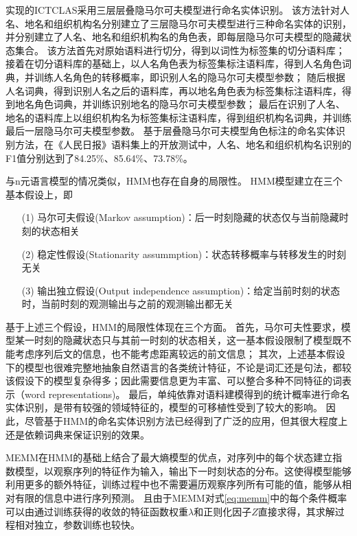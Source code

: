 \citet{张华平2004基于角色标注的中国人名自动识别研究}实现的ICTCLAS采用三层层叠隐马尔可夫模型进行命名实体识别。
该方法针对人名、地名和组织机构名分别建立了三层隐马尔可夫模型进行三种命名实体的识别，并分别建立了人名、地名和组织机构名的角色表，即每层隐马尔可夫模型的隐藏状态集合。
该方法首先对原始语料进行切分，得到以词性为标签集的切分语料库；
接着在切分语料库的基础上，以人名角色表为标签集标注语料库，得到人名角色词典，并训练人名角色的转移概率，即识别人名的隐马尔可夫模型参数；
随后根据人名词典，得到识别人名之后的语料库，再以地名角色表为标签集标注语料库，得到地名角色词典，并训练识别地名的隐马尔可夫模型参数；
最后在识别了人名、地名的语料库上以组织机构名为标签集标注语料库，得到组织机构名词典，并训练最后一层隐马尔可夫模型参数。
基于层叠隐马尔可夫模型角色标注的命名实体识别方法，在《人民日报》语料集上的开放测试中，人名、地名和组织机构名识别的F1值分别达到了84.25\%、85.64\%、73.78\%。

与n元语言模型的情况类似，HMM也存在自身的局限性。
HMM模型建立在三个基本假设上，即
\begin{enumerate}[leftmargin=*]
    \item[(1)] 马尔可夫假设(Markov assumption)：后一时刻隐藏的状态仅与当前隐藏时刻的状态相关
    \item[(2)] 稳定性假设(Stationarity assummption)：状态转移概率与转移发生的时刻无关
    \item[(3)] 输出独立假设(Output independence assumption)：给定当前时刻的状态时，当前时刻的观测输出与之前的观测输出都无关
\end{enumerate}
基于上述三个假设，HMM的局限性体现在三个方面。
首先，马尔可夫性要求，模型某一时刻的隐藏状态只与其前一时刻的状态相关，这一基本假设限制了模型既不能考虑序列后文的信息，也不能考虑距离较远的前文信息；
其次，上述基本假设下的模型也很难完整地抽象自然语言的各类统计特征，不论是词汇还是句法，都较该假设下的模型复杂得多；因此需要信息更为丰富、可以整合多种不同特征的词表示（word representations)。
最后，单纯依靠对语料建模得到的统计概率进行命名实体识别，是带有较强的领域特征的，模型的可移植性受到了较大的影响。
因此，尽管基于HMM的命名实体识别方法已经得到了广泛的应用，但其很大程度上还是依赖词典来保证识别的效果。

MEMM在HMM的基础上结合了最大熵模型的优点，对序列中的每个状态建立指数模型，以观察序列的特征作为输入，输出下一时刻状态的分布。这使得模型能够利用更多的额外特征，训练过程中也不需要遍历观察序列所有可能的值，能够从相对有限的信息中进行序列预测。
且由于MEMM对式\ref{eq:memm}中的每个条件概率可以由通过训练获得的收敛的特征函数权重$\lambda$和正则化因子$Z$直接求得，其求解过程相对独立，参数训练也较快。


